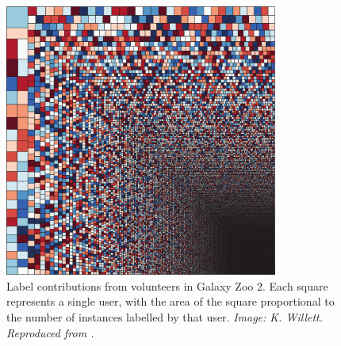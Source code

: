     \begin{figure}
        \centering
        \includegraphics[width=0.8\textwidth]{images/galaxyzoovolunteers}
        \caption{Label contributions from volunteers in Galaxy Zoo 2. Each
            square represents a single user, with the area of the square
            proportional to the number of instances labelled by that user.
            \emph{Image: K. Willett. Reproduced from \citet{marshall15}.}}
        \label{fig:galaxy-zoo-2-volunteer-distribution}
    \end{figure}
